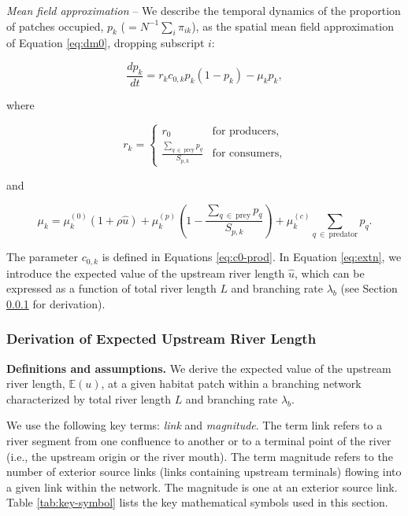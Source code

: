 \documentclass[11pt, class=article, crop=false]{standalone}
\begin{document}
\textit{Mean field approximation} --
We describe the temporal dynamics of the proportion of patches occupied, $p_k$ ($= N^{-1} \sum_i \pi_{ik}$), as the spatial mean field approximation of Equation \ref{eq:dm0}, dropping subscript $i$:

\begin{equation}
    \frac{dp_k}{dt} = r_{k} c_{0, k} p_{k} (1 - p_{k}) - \mu_{k} p_{k},
    \label{eq:master}
\end{equation}

where

\begin{equation}
    r_{k} = 
    \begin{cases}
        r_0 & \text{for producers,}\\
        \frac{\sum_{q~\in~\text{prey}} p_{q}}{S_{p,k}} & \text{for consumers,}
    \end{cases}
\end{equation}

and

\begin{equation}
    \mu_{k} = 
        \mu_{k}^{(0)} (1 + \rho \hat{u}) + 
        \mu_{k}^{(p)} \left(1 - \frac{\sum_{q~\in~\text{prey}} p_{q}}{S_{p, k}} \right) + 
        \mu_{k}^{(c)} \sum_{q~\in~\text{predator}} p_{q}.
    \label{eq:extn}    
\end{equation}

The parameter $c_{0, k}$ is defined in Equations \ref{eq:c0-prod}. 
In Equation \ref{eq:extn}, we introduce the expected value of the upstream river length $\hat{u}$, which can be expressed as a function of total river length $L$ and branching rate $\lambda_b$ (see Section \ref{updist} for derivation).

\subsubsection{Derivation of Expected Upstream River Length} \label{updist}

\textbf{Definitions and assumptions.}
We derive the expected value of the upstream river length, $\mathbb{E}(u)$, at a given habitat patch within a branching network characterized by total river length $L$ and branching rate $\lambda_b$.

We use the following key terms: \textit{link} and \textit{magnitude}.
The term link refers to a river segment from one confluence to another or to a terminal point of the river (i.e., the upstream origin or the river mouth).
The term magnitude refers to the number of exterior source links (links containing upstream terminals) flowing into a given link within the network.
The magnitude is one at an exterior source link.
Table \ref{tab:key-symbol} lists the key mathematical symbols used in this section.
\end{document}
